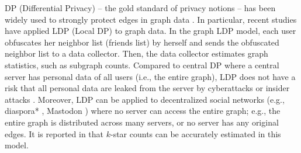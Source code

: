DP (Differential Privacy) \cite{Dwork_ICALP06,DP} -- the gold standard of privacy notions -- has been widely used to strongly protect edges in graph data \cite{Day_SIGMOD16,Ding_TKDE21,Hay_ICDM09,Imola_USENIX21,Imola_USENIX22,Karwa_PVLDB11,Kasiviswanathan_TCC13,qin2017generating,Sun_CCS19,Ye_ICDE20,Ye_TKDE21}. 
In particular, recent studies 
\cite{Imola_USENIX21,Imola_USENIX22,qin2017generating,Ye_ICDE20,Ye_TKDE21} 
have applied LDP (Local DP) \cite{Kasiviswanathan_FOCS08} to 
graph data. 
In the graph LDP model, each user obfuscates her neighbor list (friends list) by herself and sends the obfuscated neighbor list to a data collector. 
Then, the data collector estimates graph statistics, such as subgraph counts. 
Compared to central DP where a central server has personal data of all users (i.e., the entire graph), LDP does not have a risk that all personal data are leaked from the server by 
cyberattacks 
\cite{Henriquez_breach2021} or insider attacks \cite{Kohen_insider_threats}. 
Moreover, LDP can be applied to decentralized social networks \cite{Paul_CN14,Salve_CSR18} (e.g., diaspora* \cite{Diaspora}, Mastodon \cite{Mastodon}) where no server can access the entire graph; e.g., 
the entire graph is distributed across many servers, or no server has any original edges. 
It is reported in \cite{Imola_USENIX21} that $k$-star counts can be accurately estimated in this model. 

